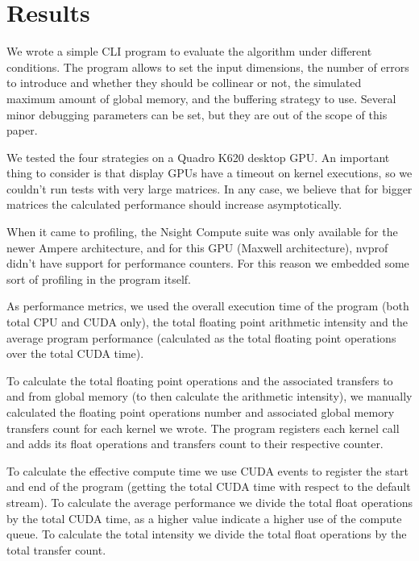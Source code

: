 \section{Results}
\label{sec:results}

We wrote a simple CLI program to evaluate the algorithm under different conditions.
The program allows to set the input dimensions, the number of errors to introduce
and whether they should be collinear or not,
the simulated maximum amount of global memory, and the buffering strategy to use.
Several minor debugging parameters can be set, but they are out of the scope of this paper.

We tested the four strategies on a Quadro K620 desktop GPU. An important thing to consider is that display GPUs have a timeout on kernel executions, so we couldn't run tests with very large matrices. In any case, we believe that for bigger matrices the calculated performance should increase asymptotically.

When it came to profiling, the Nsight Compute suite was only available for the newer Ampere architecture, and for this GPU (Maxwell architecture), nvprof didn't have support for performance counters. For this reason we embedded some sort of profiling in the program itself.

As performance metrics, we used the overall execution time of the program (both total CPU and CUDA only), the total floating point arithmetic intensity and the average program performance (calculated as the total floating point operations over the total CUDA time).

To calculate the total floating point operations and the associated transfers to and from global memory (to then calculate the arithmetic intensity), we manually calculated the floating point operations number and associated global memory transfers count for each kernel we wrote. The program registers each kernel call and adds its float operations and transfers count to their respective counter.

To calculate the effective compute time we use CUDA events to register the start and end of the program (getting the total CUDA time with respect to the default stream).
To calculate the average performance we divide the total float operations by the total CUDA time, as a higher value indicate a higher use of the compute queue.
To calculate the total intensity we divide the total float operations by the total transfer count.

